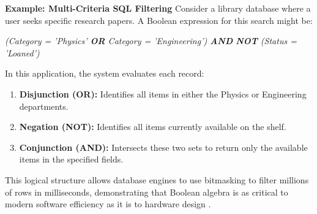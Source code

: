 \bigskip
\textbf{Example: Multi-Criteria SQL Filtering}
Consider a library database where a user seeks specific research papers. A Boolean expression for this search might be:
\begin{center}
    \textit{(Category = 'Physics' \textbf{OR} Category = 'Engineering') \textbf{AND} \textbf{NOT} (Status = 'Loaned')}
\end{center}

In this application, the system evaluates each record:
\begin{enumerate}
    \item \textbf{Disjunction (OR):} Identifies all items in either the Physics or Engineering departments.
    \item \textbf{Negation (NOT):} Identifies all items currently available on the shelf.
    \item \textbf{Conjunction (AND):} Intersects these two sets to return only the available items in the specified fields.
\end{enumerate}
This logical structure allows database engines to use bitmasking to filter millions of rows in milliseconds, demonstrating that Boolean algebra is as critical to modern software efficiency as it is to hardware design \cite{gfg2026boolean}.